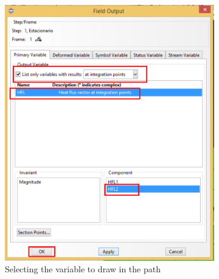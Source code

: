 \begin{itemize}
\begin{figure}[!h]
    \begin{subfigure}[!h]{0.60\textwidth}
      \includegraphics[width=\textwidth]{./body/images/post14.pdf}
      \caption{Selecting the variable to draw in the path}
      \label{post14}
    \end{subfigure}%
    \begin{subfigure}[!h]{0.40\textwidth}

\end{subfigure}
\end{figure}
\end{itemize}
